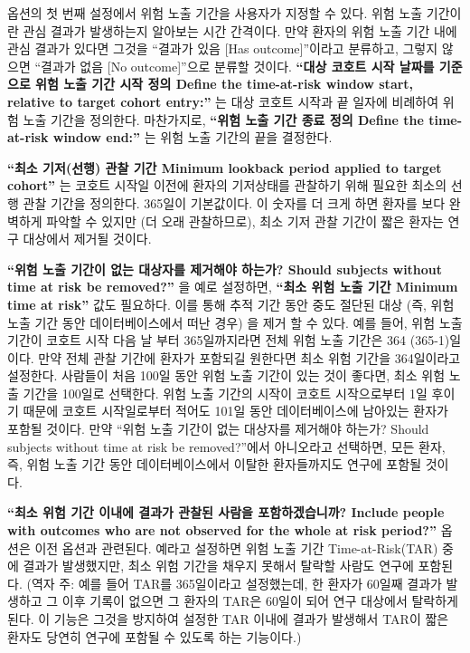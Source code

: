 \documentclass[10.5pt]{book}
\theoremstyle{definition}
\theoremstyle{definition}
\theoremstyle{definition}
\theoremstyle{remark}
\begin{document}
옵션의 첫 번째 설정에서 위험 노출 기간을 사용자가 지정할 수 있다. 위험
노출 기간이란 관심 결과가 발생하는지 알아보는 시간 간격이다. 만약 환자의
위험 노출 기간 내에 관심 결과가 있다면 그것을 ``결과가 있음 {[}Has
outcome{]}''이라고 분류하고, 그렇지 않으면 ``결과가 없음 {[}No
outcome{]}''으로 분류할 것이다. \textbf{``대상 코호트 시작 날짜를
기준으로 위험 노출 기간 시작 정의 Define the time-at-risk window start,
relative to target cohort entry:''} 는 대상 코호트 시작과 끝 일자에
비례하여 위험 노출 기간을 정의한다. 마찬가지로, \textbf{``위험 노출 기간
종료 정의 Define the time-at-risk window end:''} 는 위험 노출 기간의
끝을 결정한다.

\textbf{``최소 기저(선행) 관찰 기간 Minimum lookback period applied to
target cohort''} 는 코호트 시작일 이전에 환자의 기저상태를 관찰하기 위해
필요한 최소의 선행 관찰 기간을 정의한다. 365일이 기본값이다. 이 숫자를
더 크게 하면 환자를 보다 완벽하게 파악할 수 있지만 (더 오래 관찰하므로),
최소 기저 관찰 기간이 짧은 환자는 연구 대상에서 제거될 것이다.

\textbf{``위험 노출 기간이 없는 대상자를 제거해야 하는가? Should
subjects without time at risk be removed?''} 을 예로 설정하면,
\textbf{``최소 위험 노출 기간 Minimum time at risk''} 값도 필요하다.
이를 통해 추적 기간 동안 중도 절단된 대상 (즉, 위험 노출 기간 동안
데이터베이스에서 떠난 경우) 을 제거 할 수 있다. 예를 들어, 위험 노출
기간이 코호트 시작 다음 날 부터 365일까지라면 전체 위험 노출 기간은 364
(365-1)일이다. 만약 전체 관찰 기간에 환자가 포함되길 원한다면 최소 위험
기간을 364일이라고 설정한다. 사람들이 처음 100일 동안 위험 노출 기간이
있는 것이 좋다면, 최소 위험 노출 기간을 100일로 선택한다. 위험 노출
기간의 시작이 코호트 시작으로부터 1일 후이기 때문에 코호트 시작일로부터
적어도 101일 동안 데이터베이스에 남아있는 환자가 포함될 것이다. 만약
``위험 노출 기간이 없는 대상자를 제거해야 하는가? Should subjects
without time at risk be removed?''에서 아니오라고 선택하면, 모든 환자,
즉, 위험 노출 기간 동안 데이터베이스에서 이탈한 환자들까지도 연구에
포함될 것이다.

\textbf{``최소 위험 기간 이내에 결과가 관찰된 사람을 포함하겠습니까?
Include people with outcomes who are not observed for the whole at risk
period?''} 옵션은 이전 옵션과 관련된다. 예라고 설정하면 위험 노출 기간
Time-at-Risk(TAR) 중에 결과가 발생했지만, 최소 위험 기간을 채우지 못해서
탈락할 사람도 연구에 포함된다. (역자 주: 예를 들어 TAR를 365일이라고
설정했는데, 한 환자가 60일째 결과가 발생하고 그 이후 기록이 없으면 그
환자의 TAR은 60일이 되어 연구 대상에서 탈락하게 된다. 이 기능은 그것을
방지하여 설정한 TAR 이내에 결과가 발생해서 TAR이 짧은 환자도 당연히
연구에 포함될 수 있도록 하는 기능이다.)
\end{document}
